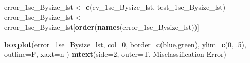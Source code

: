 \documentclass[
]{book}
\newenvironment{Shaded}{\begin{snugshade}}{\end{snugshade}}
\newcommand{\DataTypeTok}[1]{\textcolor[rgb]{0.13,0.29,0.53}{#1}}
\newcommand{\DecValTok}[1]{\textcolor[rgb]{0.00,0.00,0.81}{#1}}
\newcommand{\FloatTok}[1]{\textcolor[rgb]{0.00,0.00,0.81}{#1}}
\newcommand{\KeywordTok}[1]{\textcolor[rgb]{0.13,0.29,0.53}{\textbf{#1}}}
\newcommand{\NormalTok}[1]{#1}
\newcommand{\StringTok}[1]{\textcolor[rgb]{0.31,0.60,0.02}{#1}}
\begin{document}
\begin{Shaded}
\begin{Highlighting}[]
\NormalTok{error\_1se\_Bysize\_lst <{-}}\StringTok{ }\KeywordTok{c}\NormalTok{(cv\_1se\_Bysize\_lst, test\_1se\_Bysize\_lst)}
\NormalTok{error\_1se\_Bysize\_lst <{-}}\StringTok{ }\NormalTok{error\_1se\_Bysize\_lst[}\KeywordTok{order}\NormalTok{(}\KeywordTok{names}\NormalTok{(error\_1se\_Bysize\_lst))]}

\KeywordTok{boxplot}\NormalTok{(error\_1se\_Bysize\_lst,}
  \DataTypeTok{col=}\DecValTok{0}\NormalTok{,}
  \DataTypeTok{border=}\KeywordTok{c}\NormalTok{(}\StringTok{\textquotesingle{}blue\textquotesingle{}}\NormalTok{,}\StringTok{\textquotesingle{}green\textquotesingle{}}\NormalTok{),}
  \DataTypeTok{ylim=}\KeywordTok{c}\NormalTok{(}\DecValTok{0}\NormalTok{, }\FloatTok{.5}\NormalTok{),}
  \DataTypeTok{outline=}\NormalTok{F,}
  \DataTypeTok{xaxt=}\StringTok{\textquotesingle{}n\textquotesingle{}}
\NormalTok{)}
\KeywordTok{mtext}\NormalTok{(}\DataTypeTok{side=}\DecValTok{2}\NormalTok{, }\DataTypeTok{outer=}\NormalTok{T,  }\StringTok{\textquotesingle{}Misclassification Error\textquotesingle{}}\NormalTok{)}


\end{Highlighting}
\end{Shaded}
\end{document}
